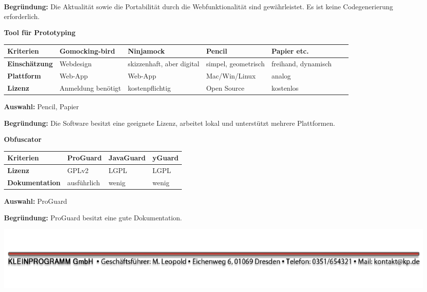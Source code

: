 \documentclass[12pt]{article}
\begin{document}
\textbf{Begründung:} Die Aktualität sowie die Portabilität durch die Webfunktionalität sind gewährleistet. Es ist keine Codegenerierung erforderlich.

\vspace*{10mm}

\textbf{Tool für Prototyping}

\begin{tabularx}{\textwidth}{|X|X|X|X|X|X|X|}\hline
 \textbf{Kriterien}&\textbf{Gomocking-bird}&\textbf{Ninjamock}&\textbf{Pencil}&\textbf{Papier etc.}\\ \hline
 \textbf{Einschätzung}&Webdesign&skizzenhaft, aber digital&simpel, geometrisch&freihand, dynamisch\\ \hline
 \textbf{Plattform}&Web-App&Web-App&Mac/Win/Linux&analog\\ \hline
 \textbf{Lizenz}&Anmeldung benötigt&kostenpflichtig&Open Source&kostenlos\\ \hline
\end{tabularx}

\vspace*{3mm}

\textbf{Auswahl:} Pencil, Papier

\textbf{Begründung:} Die Software besitzt eine geeignete Lizenz, arbeitet lokal und unterstützt mehrere Plattformen.

\vspace*{10mm}

\textbf{Obfuscator}

\begin{tabularx}{\textwidth}{|X|X|X|X|}\hline
 \textbf{Kriterien}&\textbf{ProGuard}&\textbf{JavaGuard}&\textbf{yGuard}\\ \hline
 \textbf{Lizenz}&GPLv2&LGPL&LGPL\\ \hline
 \textbf{Dokumentation}&ausführlich&wenig&wenig\\ \hline
\end{tabularx}

\vspace*{3mm}

\textbf{Auswahl:} ProGuard

\textbf{Begründung:} ProGuard besitzt eine gute Dokumentation.

\vspace*{3mm}
\vspace*{\fill}
\includegraphics[scale=0.9]{footer.pdf}
\thispagestyle{empty}
\end{document}
